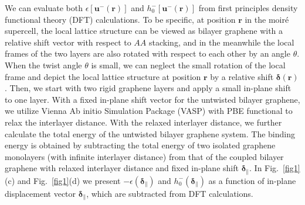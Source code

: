 \documentclass[aps,prx,10pt,twocolumn,superscriptaddress]{revtex4}
\begin{document}
We can evaluate both $\epsilon[\bm{u}^{-}(\textbf{r})]$ and $h^{-}_{0}[\bm{u}^{-}(\textbf{r})]$ from first principles density functional theory (DFT) calculations. To be specific, at position $\mathbf{r}$ in the moir\'e supercell, the local lattice structure can be viewed as bilayer graphene with a relative shift vector with respect to $AA$ stacking, and in the meanwhile the local frames of the two layers are also rotated with respect to each other  by an angle $\theta$. When the twist angle $\theta$ is small, we can neglect the small rotation of the local frame and depict the local lattice structure at  position $\textbf{r}$ by a relative shift $\bm{\delta}(\textbf{r})$. Then, we start with two rigid  graphene layers and apply a small in-plane shift to one  layer. With a fixed in-plane shift vector for the untwisted bilayer graphene, we utilize Vienna Ab initio Simulation Package (VASP) \cite{VASP1,VASP2,VASP3,VASP4} with PBE functional \cite{PBE} to relax the interlayer distance. 
With the relaxed interlayer distance, we further calculate the total energy of the untwisted bilayer graphene system. The binding energy is obtained by subtracting the total energy of two isolated  graphene monolayers (with infinite interlayer distance) from  that of the coupled bilayer graphene with relaxed interlayer distance and fixed in-plane shift  $\bm{\delta}_{\parallel}$. In Fig.~\ref{fig1}(c) and Fig.~\ref{fig1}(d)  we present $-\epsilon(\bm{\delta}_{\parallel})$ and $h^{-}_{0}(\bm{\delta}_{\parallel})$ as a function of in-plane  displacement vector $\bm{\delta}_{\parallel}$, which are subtracted from DFT calculations.  
\end{document}
